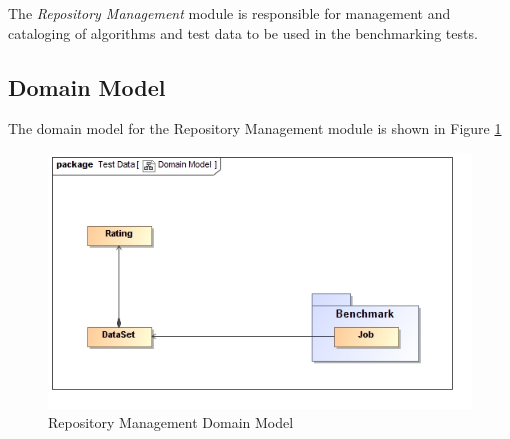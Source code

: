 The \textit{Repository Management} module is responsible for management and cataloging of
algorithms and test data to be used in the benchmarking tests.

\subsection{Domain Model}
The domain model for the Repository Management module is shown in Figure \ref{fig:repoManDomain}
\begin{figure}[H]
  \begin{center}
  \includegraphics[scale=0.5]{../Diagrams and Charts/Test Data/Domain Model.jpg}  
  \caption{Repository Management Domain Model}
  \end{center}
  \label{fig:repoManDomain}
\end{figure}

